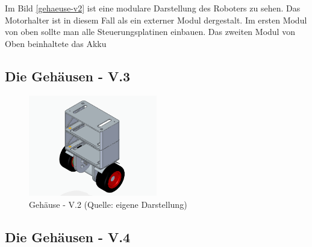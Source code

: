 Im Bild \ref{gehaeuse-v2} ist eine modulare Darstellung des Roboters zu sehen. Das Motorhalter ist in diesem Fall als ein externer Modul dergestalt. Im ersten Modul von oben sollte man alle Steuerungsplatinen  einbauen. Das zweiten Modul von Oben beinhaltete das Akku


\renewcommand{\autoren}{Valentyn Chepil}
\newpage

\subsection{Die Gehäusen - V.3}


\begin{figure}[!h]  %
	\centering\includegraphics[width=0.5\textwidth]{images/gehaeuse-v3.png}
	\caption{Gehäuse - V.2 \newline (Quelle: eigene Darstellung)}
	\label{gehaeuse-v3} %
\end{figure}

\subsection{Die Gehäusen - V.4}







